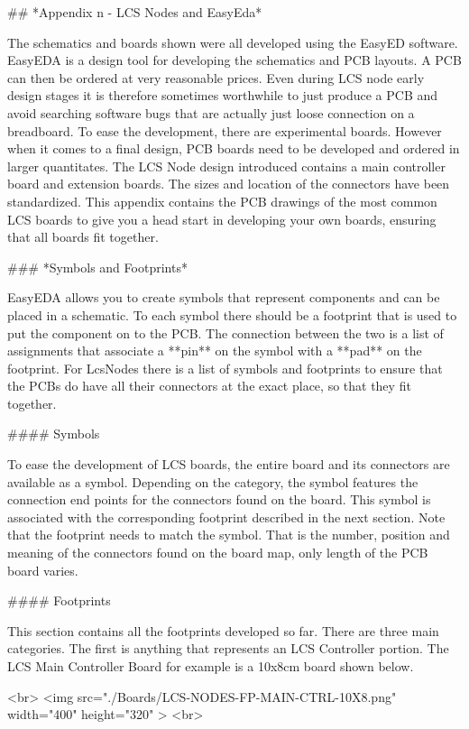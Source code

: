 ## *Appendix n - LCS Nodes and EasyEda*

The schematics and boards shown were all developed using the EasyED software. EasyEDA is a design tool for developing the schematics and PCB layouts. A PCB can then be ordered at very reasonable prices. Even during LCS node early design stages it is therefore sometimes worthwhile to just produce a PCB and avoid searching software bugs that are actually just loose connection on a breadboard. To ease the development, there are experimental boards. However when it comes to a final design, PCB boards need to be developed and ordered in larger quantitates. The LCS Node design introduced contains a main controller board and extension boards. The sizes and location of the connectors have been standardized. This appendix contains the PCB drawings of the most common LCS boards to give you a head start in developing your own boards, ensuring that all boards fit together.

### *Symbols and Footprints*

EasyEDA allows you to create symbols that represent components and can be placed in a schematic. To each symbol there should be a footprint that is used to put the component on to the PCB. The connection between the two is a list of assignments that associate a **pin** on the symbol with a **pad** on the footprint. For LcsNodes there is a list of symbols and footprints to ensure that the PCBs do have all their connectors at the exact place, so that they fit together.

#### Symbols

To ease the development of LCS boards, the entire board and its connectors are available as a symbol. Depending on the category, the symbol features the connection end points for the connectors found on the board. This symbol is associated with the corresponding footprint described in the next section. Note that the footprint needs to match the symbol. That is the number, position and meaning of the connectors found on the board map, only length of the PCB board varies.


#### Footprints

This section contains all the footprints developed so far. There are three main categories. The first is anything that represents an LCS Controller portion. The LCS Main Controller Board for example is a 10x8cm board shown below.

<br>
<img src="./Boards/LCS-NODES-FP-MAIN-CTRL-10X8.png" width="400" height="320" > 
<br>

